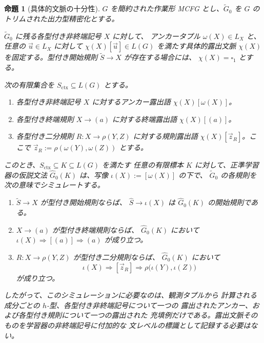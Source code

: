 \documentclass[11pt,a4paper]{ltjsarticle}
\newtheorem{proposition}[theorem]{命題}
\theoremstyle{remark}
\newcommand{\tuple}[1]{\vec{#1}}
\newcommand{\blank}{\square}
\begin{document}
\begin{proposition}[具体的文脈の十分性]
\label{prop:concrete-context-sufficiency}
\(G\) を簡約された作業形 MCFG とし、\(\widetilde G_0\) を
\(G\) のトリムされた出力型精密化とする。

\(\widetilde G_0\) に残る各型付き非終端記号 \(X\) に対して、
アンカータプル \(\omega(X)\in L_X\) と、任意の
\(\tuple u\in L_X\) に対して
\(\chi(X)[\tuple u]\in L(G)\) を満たす具体的露出文脈
\(\chi(X)\) を固定する。型付き開始規則
\(\widetilde S\to X\) が存在する場合には、
\(\chi(X)=\blank_1\) とする。

次の有限集合を \(S_{\mathrm{ctx}}\subseteq L(G)\) とする。
\begin{enumerate}[label=(\roman*),leftmargin=*]
\item 各型付き非終端記号 \(X\) に対するアンカー露出語
      \(\chi(X)[\omega(X)]\)。
\item 各型付き終端規則 \(X\to(a)\) に対する終端露出語
      \(\chi(X)[(a)]\)。
\item 各型付き二分規則
      \(R\colon X\to\rho(Y,Z)\) に対する規則露出語
      \(\chi(X)[\tuple z_R]\)。ここで
      \(\tuple z_R:=\rho(\omega(Y),\omega(Z))\) とする。
\end{enumerate}

このとき、\(S_{\mathrm{ctx}}\subseteq K\subseteq L(G)\) を満たす
任意の有限標本 \(K\) に対して、正準学習器の仮説文法
\(\widehat G_0(K)\) は、写像
\(\iota(X):=[\omega(X)]\) の下で、
\(\widetilde G_0\) の各規則を次の意味でシミュレートする。
\begin{enumerate}[label=(\roman*),leftmargin=*]
\item \(\widetilde S\to X\) が型付き開始規則ならば、
      \(\widehat S\to\iota(X)\) は
      \(\widehat G_0(K)\) の開始規則である。
\item \(X\to(a)\) が型付き終端規則ならば、
      \(\widehat G_0(K)\) において
      \(\iota(X)\Rightarrow[(a)]\Rightarrow(a)\) が成り立つ。
\item \(R\colon X\to\rho(Y,Z)\) が型付き二分規則ならば、
      \(\widehat G_0(K)\) において
      \[
        \iota(X)
        \Rightarrow[\tuple z_R]
        \Rightarrow
        \rho\bigl(\iota(Y),\iota(Z)\bigr)
      \]
      が成り立つ。
\end{enumerate}

したがって、このシミュレーションに必要なのは、観測タプルから
計算される成分ごとの \(h\)-型、各型付き非終端記号について一つの
露出されたアンカー、および各型付き規則について一つの露出された
充填例だけである。露出文脈そのものを学習器の非終端記号に付加的な
文レベルの標識として記録する必要はない。
\end{proposition}
\end{document}
